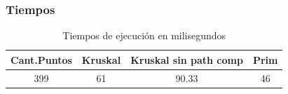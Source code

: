 \documentclass[11pt,a4paper]{article}
\begin{document}
\subsubsection{Tiempos}
\begin{table}[ht]
\caption{Tiempos de ejecución en milisegundos} %
\centering %
\begin{tabular}{c c c c} %
\hline\hline %
Cant.Puntos & Kruskal & Kruskal sin path comp & Prim \\ [0.5ex] %
\hline %
399 & 61 & 90.33 & 46 \\ [1ex] %
\hline %
\end{tabular}
\label{table:nonlin} %
\end{table} 
\end{document}
